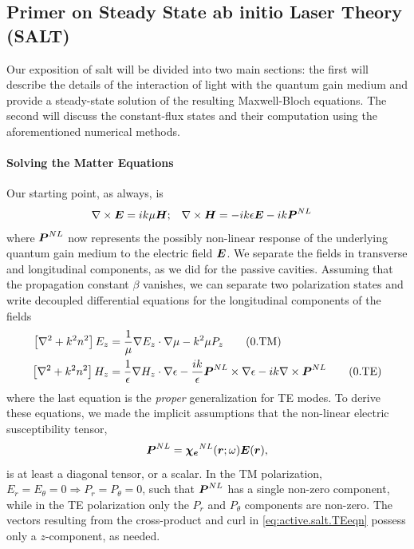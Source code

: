 \subsection{Primer on Steady State ab initio Laser Theory (SALT)}
Our exposition of \gls{salt} will be divided into two main sections:
the first will describe the details of the interaction of light with
the quantum gain medium and provide a steady-state solution
of the resulting Maxwell-Bloch equations. The second
will discuss the constant-flux states and their computation
using the aforementioned numerical methods. 

\paragraph{Solving the Matter Equations}
Our starting point, as always, is
  \begin{align}
   \nabla\times\boldsymbol{E}	&= ik\mu\boldsymbol{H};	&	\nabla\times\boldsymbol{H}	&= -ik\epsilon\boldsymbol{E}-ik\boldsymbol{P}^{NL}
  \end{align}
where $\boldsymbol{P}^{NL}$ now represents the possibly non-linear response
of the underlying quantum gain medium to the electric field $\boldsymbol{E}$.
We separate the fields in transverse and longitudinal
components, as we did for the passive cavities. Assuming 
that the propagation constant $\beta$ vanishes, we can 
separate two polarization states and write decoupled differential
equations for the longitudinal components of the fields
	\begin{subequations}
	\begin{align}
		\left[\nabla^2+k^2n^2\right]E_z	&= \frac{1}{\mu}\nabla E_z\cdot\nabla\mu -k^2\mu P_z	\tag{\theequation.TM}\\
		\left[\nabla^2+k^2n^2\right]H_z	&= \frac{1}{\epsilon}\nabla H_z\cdot\nabla\epsilon-
											\frac{ik}{\epsilon}\boldsymbol{P}^{NL}\times\nabla\epsilon
											-ik\nabla\times\boldsymbol{P}^{NL}							\tag{\theequation.TE}\label{eq:active.salt.TEeqn}
	\end{align}
	\end{subequations}
where the last equation is the \textit{proper} generalization for TE modes. 
To derive these equations, we made the implicit assumptions that the 
non-linear electric susceptibility tensor, 
	\begin{equation}
		\boldsymbol{P}^{NL} = \boldsymbol{\chi_e}^{NL}(\boldsymbol{r};\omega)\boldsymbol{E}(\boldsymbol{r}),
	\end{equation}
is at least a diagonal tensor, or a scalar. In the TM polarization, 
$E_r=E_\theta=0\Rightarrow P_r=P_\theta=0$, such that $\boldsymbol{P}^{NL}$
has a single non-zero component, while in the TE polarization only
the $P_r$ and $P_\theta$ components are non-zero. The vectors resulting
from the cross-product and curl in \eqref{eq:active.salt.TEeqn} possess
only a $z$-component, as needed. 

